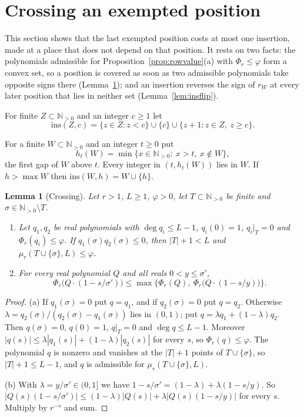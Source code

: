 \documentclass[11pt]{article}
\newtheorem{lemma}[theorem]{Lemma}
\newcommand{\N}{\mathbb N}
\begin{document}
\section{Crossing an exempted position}\label{sec:crossing}

This section shows that the last exempted position costs at most one
insertion, made at a place that does not depend on that position.  It
rests on two facts: the polynomials admissible for
Proposition~\ref{prop:rowvalue}(a) with $\Phi_r\le\varphi$ form a convex
set, so a position is covered as soon as two admissible polynomials take
opposite signs there (Lemma~\ref{lem:crossing}); and an insertion reverses
the sign of $r_W$ at every later position that lies in neither set
(Lemma~\ref{lem:insflip}).

For finite $Z\subset\N_{>0}$ and an integer $c\ge1$ let
\[
  \mathrm{ins}(Z,c)=\{z\in Z:z<c\}\cup\{c\}\cup\{z+1:z\in Z,\ z\ge c\}.
\]

For a finite $W\subset\N_{>0}$ and an integer $t\ge0$ put
\[
  h_t(W)=\min\{x\in\N_{>0}:\ x>t,\ x\notin W\},
\]
the first gap of $W$ above $t$.  Every integer in $(t,h_t(W))$ lies in $W$.
If $h>\max W$ then $\mathrm{ins}(W,h)=W\cup\{h\}$.

\begin{lemma}[Crossing]\label{lem:crossing}
Let $r>1$, $L\ge1$, $\varphi>0$, let $T\subset\N_{>0}$ be finite and
$\sigma\in\N_{>0}\setminus T$.
\begin{enumerate}
\item[(a)] Let $q_1,q_2$ be real polynomials with $\deg q_i\le L-1$,
$q_i(0)=1$, $q_i|_T=0$ and $\Phi_r(q_i)\le\varphi$.  If
$q_1(\sigma)q_2(\sigma)\le0$, then $|T|+1<L$ and
$\mu_r(T\cup\{\sigma\},L)\le\varphi$.
\item[(b)] For every real polynomial $Q$ and all reals $0<y\le\sigma'$,
\[
  \Phi_r\bigl(Q\cdot(1-s/\sigma')\bigr)\le
  \max\bigl\{\Phi_r(Q),\ \Phi_r\bigl(Q\cdot(1-s/y)\bigr)\bigr\}.
\]
\end{enumerate}
\end{lemma}

\begin{proof}
(a) If $q_1(\sigma)=0$ put $q=q_1$, and if $q_2(\sigma)=0$ put $q=q_2$.
Otherwise $\lambda=q_2(\sigma)/(q_2(\sigma)-q_1(\sigma))$ lies in $(0,1)$;
put $q=\lambda q_1+(1-\lambda)q_2$.  Then $q(\sigma)=0$, $q(0)=1$, $q|_T=0$
and $\deg q\le L-1$.  Moreover
$|q(s)|\le\lambda|q_1(s)|+(1-\lambda)|q_2(s)|$ for every $s$, so
$\Phi_r(q)\le\varphi$.  The polynomial $q$ is nonzero and vanishes at the
$|T|+1$ points of $T\cup\{\sigma\}$, so $|T|+1\le L-1$, and $q$ is admissible
for $\mu_r(T\cup\{\sigma\},L)$.

(b) With $\lambda=y/\sigma'\in(0,1]$ we have
$1-s/\sigma'=(1-\lambda)+\lambda(1-s/y)$.  So
$|Q(s)(1-s/\sigma')|\le(1-\lambda)|Q(s)|+\lambda|Q(s)(1-s/y)|$ for every $s$.
Multiply by $r^{-s}$ and sum.
\end{proof}
\end{document}
